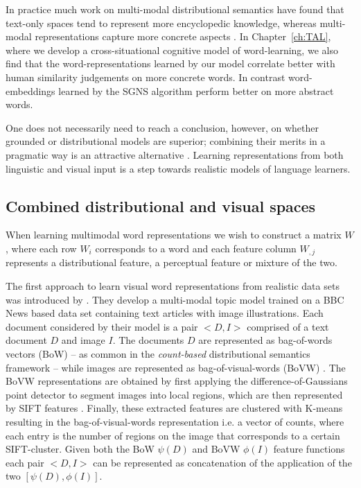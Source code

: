 In practice much work on multi-modal distributional semantics have found that text-only spaces tend to
represent more encyclopedic knowledge, whereas multi-modal representations capture more concrete aspects
\citep{andrews2009integrating,baroni2008concepts}. In Chapter~\ref{ch:TAL}, where we develop
a cross-situational cognitive model of word-learning, we also find that the word-representations learned by
our model correlate better with human similarity judgements on more concrete words. In contrast 
word-embeddings learned by the SGNS algorithm perform better on more abstract words.

One does not necessarily need to
reach a conclusion, however, on whether grounded or distributional models are superior; 
combining their merits in a
pragmatic way is an attractive alternative \citep{riordan2011redundancy}. Learning representations
from both linguistic and visual input is a step towards realistic models of language learners.

\subsection{Combined distributional and visual spaces}
\label{sec:distvis}

When learning multimodal word representations we wish to construct a matrix $W$, where each row $W_i$
corresponds to a word and each feature column $W_{,j}$ represents a distributional feature,
a perceptual feature or mixture of the two.

The first approach to learn visual word representations from realistic data sets
was introduced by \cite{feng2010visual}. They develop a multi-modal topic model trained on a
BBC News based data set containing text articles with image illustrations.
Each document considered by their model
is a pair $<D, I>$ comprised of a text document $D$ and image $I$.
The documents $D$ are represented as bag-of-words vectors (BoW) -- as common in the
\emph{count-based} distributional semantics framework -- while images are represented
as bag-of-visual-words (BoVW)  \citep{csurka2004visual}.  The BoVW representations are
obtained by first applying the difference-of-Gaussians point detector to segment images
into local regions, which are then represented by SIFT features \citep{lowe1999object}.
Finally, these extracted features are clustered with K-means resulting in the
bag-of-visual-words  representation i.e.
a vector of counts, where each entry is the number of regions on the image that
corresponds to a certain SIFT-cluster.  Given both the BoW  $\psi(D)$ and
BoVW $\phi(I)$ feature functions each pair $<D, I>$ can be represented as concatenation
of the application of the two $[\psi(D), \phi(I)]$.

